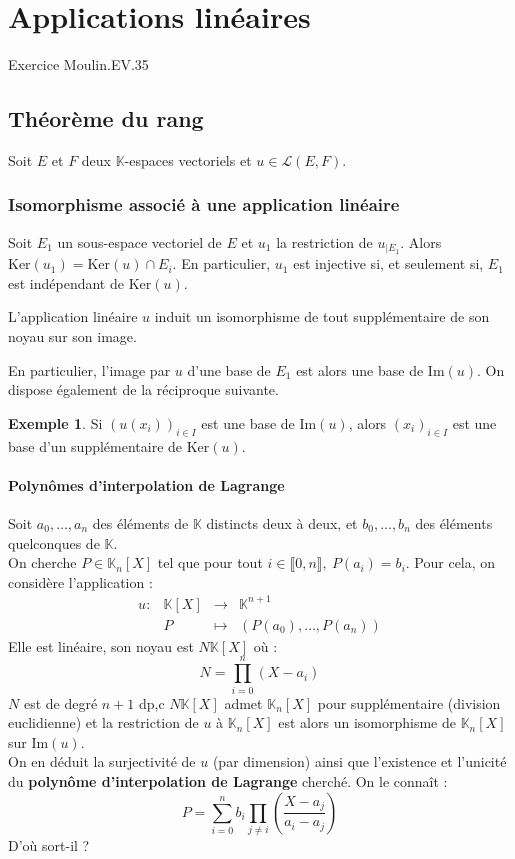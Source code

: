 \documentclass[french]{article}
\newcommand{\K}{\mathbb{K}}
\renewcommand{\ker}{\text{Ker}}
\theoremstyle{plain}
\theoremstyle{definition}
\newtheorem*{ex}{Exemple}
\theoremstyle{remark}
\begin{document}
\section{Applications linéaires}

Exercice Moulin.EV.35

\subsection{Théorème du rang}

Soit $E$ et $F$ deux $\K$-espaces vectoriels et $u\in\mathcal{L}(E,F)$.

\subsubsection*{Isomorphisme associé à une application linéaire}

Soit $E_1$ un sous-espace vectoriel de $E$ et $u_1$ la restriction de $u_{\mid E_1}$. Alors $\ker(u_1)=\ker(u)\cap E_i$. En particulier, $u_1$ est injective si, et seulement si, $E_1$ est indépendant de $\ker(u)$.

\begin{thm}
	L'application linéaire $u$ induit un isomorphisme de tout supplémentaire de son noyau sur son image.
\end{thm}

En particulier, l'image par $u$ d'une base de $E_1$ est alors une base de $\text{Im}(u)$. On dispose également de la réciproque suivante.

\begin{ex}
	Si $(u(x_i))_{i\in I}$ est une base de $\text{Im}(u)$, alors $(x_i)_{i\in I}$ est une base d'un supplémentaire de $\ker(u)$.
\end{ex}

\paragraph{Polynômes d'interpolation de Lagrange}
Soit $a_0,\ldots,a_n$ des éléments de $\K$ distincts deux à deux, et $b_0,\ldots,b_n$ des éléments quelconques de $\K$. \\
On cherche $P\in\K_n[X]$ tel que pour tout $i\in\llbracket0,n\rrbracket,\ P(a_i)=b_i$. Pour cela, on considère l'application : $$\begin{array}{lrcl}
	u:&\K[X]&\longrightarrow&\K^{n+1}\\
	&P&\longmapsto&(P(a_0),\ldots,P(a_n))
\end{array}$$ Elle est linéaire, son noyau est $N\K[X]$ où : $$N=\prod_{i=0}^{n}(X-a_i)$$ $N$ est de degré $n+1$ dp,c $N\K[X]$ admet $\K_n[X]$ pour supplémentaire (division euclidienne) et la restriction de $u$ à $\K_n[X]$ est alors un isomorphisme de $\K_n[X]$ sur $\text{Im}(u)$. \\
On en déduit la surjectivité de $u$ (par dimension) ainsi que l'existence et l'unicité du \textbf{polynôme d'interpolation de Lagrange} cherché. On le connaît : $$P=\sum_{i=0}^{n}b_i\prod_{j\ne i}\left(\frac{X-a_j}{a_i-a_j}\right)$$ D'où sort-il ? %
\end{document}
